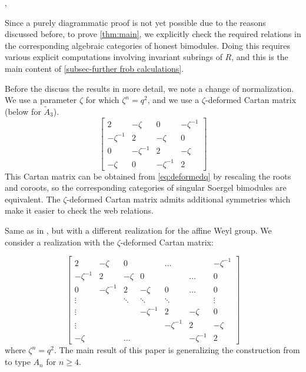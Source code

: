 {, 


Since a purely diagrammatic proof is not yet possible due to the reasons discussed before, to prove \cref{thm:main}, we explicitly check the required relations in the corresponding algebraic categories of honest bimodules.
Doing this requires various explicit computations involving invariant subrings of $R$, and this is the main content of \cref{subsec-further frob calculations}.













Before the discuss the results in more detail, we note a change of normalization. We use a parameter $\zeta$ for which $\zeta^n=q^2$, and we use a $\zeta$-deformed Cartan matrix (below for $\tilde{A}_3$).
\begin{equation} \label{eq:deformedzeta} \begin{bmatrix}
    2 &-\zeta &0 & -\zeta^{-1} \\
    -\zeta^{-1} &2 &-\zeta &0\\
    0 &-\zeta^{-1} &2 &-\zeta \\
    -\zeta & 0&-\zeta^{-1} &2
\end{bmatrix} \end{equation}
This Cartan matrix can be obtained from \eqref{eq:deformedq} by rescaling the roots and coroots, so the corresponding categories of singular Soergel bimodules are equivalent. The $\zeta$-deformed Cartan matrix admits additional symmetries which make it easier to check the web relations.






Same as in \cite{EQuantumI}, but with a different realization for the affine Weyl group. We consider a realization with the $\zeta$-deformed Cartan matrix:

$$\begin{bmatrix}
    2 &-\zeta &0 &  &\dots &  &-\zeta^{-1} \\
    -\zeta^{-1} &2 &-\zeta &0 & &\dots &0\\
    0 &-\zeta^{-1} &2 &-\zeta &0 &\ldots &0\\
    \vdots & &\ddots &\ddots &\ddots & &\vdots\\
    \vdots & &   &-\zeta^{-1} &2 &-\zeta &0\\
    \vdots & &   & &-\zeta^{-1} &2 &-\zeta \\
    -\zeta & &\dots & & &-\zeta^{-1} &2 
\end{bmatrix}$$
where $\zeta^n=q^2$. The main result of this paper is generalizing the construction from \cite{EQuantumI} to type $A_n$ for $n\geq 4$.


}